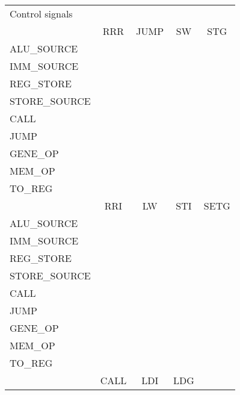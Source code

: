 \begin{table}
    \centering
    \begin{tabular}{| l | c | c | c |c |}
    \hline
    Control signals   &              &          &       &            \\
                      & RRR          & JUMP     &  SW   &  STG       \\
    \hline
    ALU\_SOURCE       &              &          &       &            \\
    IMM\_SOURCE       &              &          &       &            \\
    REG\_STORE        &              &          &       &            \\
    STORE\_SOURCE     &              &          &       &            \\
    CALL              &              &          &       &            \\
    JUMP              &              &          &       &            \\
    GENE\_OP          &              &          &       &            \\
    MEM\_OP           &              &          &       &            \\
    TO\_REG           &              &          &       &            \\
    \hline  
                      & RRI          & LW       & STI   & SETG       \\
    \hline
    ALU\_SOURCE       &              &          &       &            \\
    IMM\_SOURCE       &              &          &       &            \\
    REG\_STORE        &              &          &       &            \\
    STORE\_SOURCE     &              &          &       &            \\
    CALL              &              &          &       &            \\
    JUMP              &              &          &       &            \\
    GENE\_OP          &              &          &       &            \\
    MEM\_OP           &              &          &       &            \\
    TO\_REG           &              &          &       &            \\
    \hline
                      & CALL         & LDI      & LDG   &            \\

\end{tabular}
\end{table}
